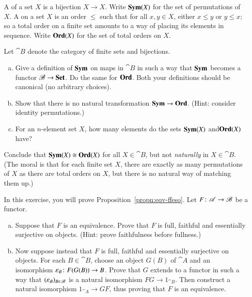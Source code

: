 \begin{question}
\label{ex:species}
A %
%
%
of a set $X$ is a bijection $X \to X$.  Write $\mathbf{Sym}(X)$ for the set of
permutations of $X$.  A  on a set $X$ is an order $\leq$ such that for all $x, y \in X$,
either $x \leq y$ or $y \leq x$; so a total order on a finite set amounts
to a way of placing its elements in sequence.  Write $\mathbf{Ord}(X)$ for the set
of total orders on $X$.

Let $\cat{B}$ denote the category of finite sets and bijections.

\begin{enumerate}[(b)]
\item
Give a definition of $\mathbf{Sym}$ on maps in $\cat{B}$ in such a way that $\mathbf{Sym}$
becomes a functor $\mathscr{B} \to \mathbf{Set}$.  Do the same for $\mathbf{Ord}$.  Both your
definitions should be canonical (no arbitrary choices).

\item
Show that there is no natural transformation $\mathbf{Sym} \to \mathbf{Ord}$.
(Hint: consider identity permutations.)

\item
For an $n$-element set $X$, how many elements do the sets $\mathbf{Sym}(X)$
and\linebreak $\mathbf{Ord}(X)$ have?
\end{enumerate}

Conclude that $\mathbf{Sym}(X) \cong \mathbf{Ord}(X)$ for all $X \in \cat{B}$, but not
\emph{naturally} in $X \in \cat{B}$.  (The moral is that for each finite
set $X$, there are exactly as many permutations of $X$ as there are total
orders on $X$, but there is no natural way of matching them up.)
\end{question}


\begin{question}
\label{ex:eqv-ffeso}
In this exercise, you will prove Proposition~\ref{propn:eqv-ffeso}.  Let $F
\from \cat{A} \to \cat{B}$ be a functor.
%
\begin{enumerate}[(b)]
\item
Suppose that $F$ is an equivalence.  Prove that $F$ is full, faithful and
essentially surjective on objects.  (Hint: prove faithfulness before
fullness.)

\item
Now suppose instead that $F$ is full, faithful and essentially surjective
on objects.  For each $B \in \cat{B}$, choose an object $G(B)$ of $\cat{A}$
and an isomorphism $\epsln_B\from F(G(B)) \to B$.  Prove that $G$ extends
to a functor in such a way that $(\varepsilon_B)_{B \in \mathscr{B}}$ is a natural
isomorphism $FG \to 1_{\cat{B}}$.  Then construct a natural isomorphism
$1_{\cat{A}} \to GF$, thus proving that $F$ is an equivalence.
\end{enumerate}
\end{question}


